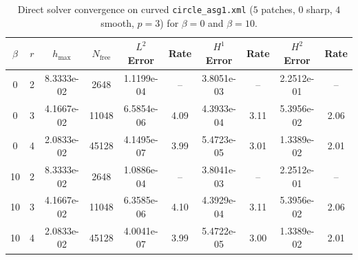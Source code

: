 \documentclass[11pt,a4paper]{article}
\begin{document}
\begin{table}[htbp]
\centering
\caption{Direct solver convergence on curved \texttt{circle\_asg1.xml} ($5$ patches, $0$ sharp, $4$ smooth, $p=3$) for $\beta=0$ and $\beta=10$.}
\label{tab:conv_circle}
\small
\begin{tabular}{cccccccccc}
\toprule
$\beta$ & $r$ & $h_{\max}$ & $N_{\mathrm{free}}$ & $L^2$ Error & Rate & $H^1$ Error & Rate & $H^2$ Error & Rate \\
\midrule
0  & 2 & 8.3333e-02 & 2648  & 1.1199e-04 & --   & 3.8051e-03 & --   & 2.2512e-01 & --   \\
0  & 3 & 4.1667e-02 & 11048 & 6.5854e-06 & 4.09 & 4.3933e-04 & 3.11 & 5.3956e-02 & 2.06 \\
0  & 4 & 2.0833e-02 & 45128 & 4.1495e-07 & 3.99 & 5.4723e-05 & 3.01 & 1.3389e-02 & 2.01 \\
\midrule
10 & 2 & 8.3333e-02 & 2648  & 1.0886e-04 & --   & 3.8041e-03 & --   & 2.2512e-01 & --   \\
10 & 3 & 4.1667e-02 & 11048 & 6.3585e-06 & 4.10 & 4.3929e-04 & 3.11 & 5.3956e-02 & 2.06 \\
10 & 4 & 2.0833e-02 & 45128 & 4.0041e-07 & 3.99 & 5.4722e-05 & 3.00 & 1.3389e-02 & 2.01 \\
\bottomrule
\end{tabular}
\end{table}
\end{document}
